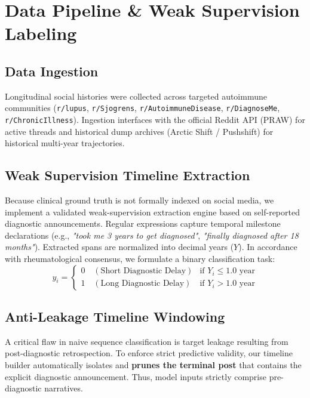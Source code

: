 \documentclass[runningheads]{llncs}
\begin{document}
\section{Data Pipeline \& Weak Supervision Labeling}
\label{sec:data}

\subsection{Data Ingestion}
Longitudinal social histories were collected across targeted autoimmune communities (\texttt{r/lupus}, \texttt{r/Sjogrens}, \texttt{r/AutoimmuneDisease}, \texttt{r/DiagnoseMe}, \texttt{r/ChronicIllness}). Ingestion interfaces with the official Reddit API (PRAW) for active threads and historical dump archives (Arctic Shift / Pushshift) for historical multi-year trajectories.

\subsection{Weak Supervision Timeline Extraction}
Because clinical ground truth is not formally indexed on social media, we implement a validated weak-supervision extraction engine based on self-reported diagnostic announcements. Regular expressions capture temporal milestone declarations (e.g., \emph{"took me 3 years to get diagnosed"}, \emph{"finally diagnosed after 18 months"}).
Extracted spans are normalized into decimal years ($Y$). In accordance with rheumatological consensus, we formulate a binary classification task:
\[
y_i = \begin{cases} 
0 \quad (\text{Short Diagnostic Delay}) & \text{if } Y_i \le 1.0\text{ year} \\
1 \quad (\text{Long Diagnostic Delay}) & \text{if } Y_i > 1.0\text{ year}
\end{cases}
\]

\subsection{Anti-Leakage Timeline Windowing}
A critical flaw in naive sequence classification is target leakage resulting from post-diagnostic retrospection. To enforce strict predictive validity, our timeline builder automatically isolates and \textbf{prunes the terminal post} that contains the explicit diagnostic announcement. Thus, model inputs strictly comprise pre-diagnostic narratives.
\end{document}
